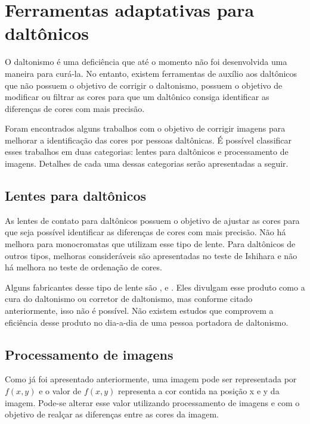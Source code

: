 \documentclass[	12pt, Times, openright, twoside, a4paper, english, brazil]{abntex2}
\begin{document}
\section{Ferramentas adaptativas para daltônicos}

O daltonismo é uma deficiência que até o momento não foi desenvolvida uma maneira para curá-la. No entanto, existem ferramentas de auxílio aos daltônicos que não possuem o objetivo de corrigir o daltonismo, possuem o objetivo de modificar ou filtrar as cores para que um daltônico consiga identificar as diferenças de cores com mais precisão. 
 
Foram encontrados alguns trabalhos com o objetivo de corrigir imagens para melhorar a identificação das cores por pessoas daltônicas. É possível classificar esses trabalhos em duas categorias: lentes para daltônicos e processamento de imagens. Detalhes de cada uma dessas categorias serão apresentadas a seguir.

\subsection{Lentes para daltônicos}

As lentes de contato para daltônicos possuem o objetivo de ajustar as cores para que seja possível identificar as diferenças de cores com mais precisão. Não há melhora para monocromatas que utilizam esse tipo de lente. Para daltônicos de outros tipos, melhoras consideráveis são apresentadas no teste de Ishihara e não há melhora no teste de ordenação de cores. 

Alguns fabricantes desse tipo de lente são ,  e . Eles divulgam esse produto como a cura do daltonismo ou corretor de daltonismo, mas conforme citado anteriormente, isso não é possível. Não existem estudos que comprovem a eficiência desse produto no dia-a-dia de uma pessoa portadora de daltonismo.

\subsection{Processamento de imagens}

Como já foi apresentado anteriormente, uma imagem pode ser representada por $f(x,y)$ e o valor de $f(x,y)$ representa a cor contida na posição x e y da imagem. Pode-se alterar esse valor utilizando processamento de imagens e com o objetivo de realçar as diferenças entre as cores da imagem.
\end{document}
